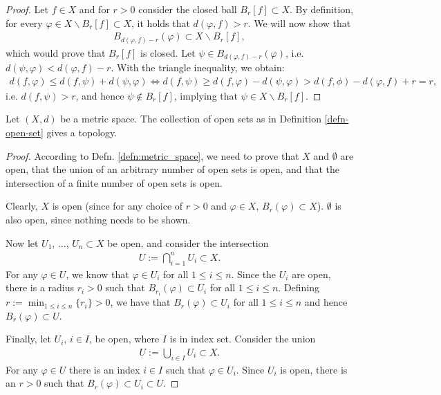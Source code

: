 \begin{proof}
	Let $f\in X$ and for $r > 0$ consider the closed ball $B_{r}[f]\subset X$. By definition, for every $\varphi \in X\backslash B_{r}[f]\subset X$, it holds that $d(\varphi, f) > r$. We will now show that 
	\begin{align}
		B_{d(\varphi, f) - r}(\varphi) \subset X \backslash B_{r}[f],
	\end{align}
	which would prove that $B_{r}[f]$ is closed. Let $\psi\in B_{d(\varphi, f) - r}(\varphi)$, i.e. $d(\psi, \varphi) < d(\varphi, f) -r$. With the triangle inequality, we obtain:
	\begin{align}
		d(f, \varphi) \leq d(f, \psi) + d(\psi, \varphi) \Leftrightarrow d(f, \psi) \geq d(f, \varphi) - d(\psi, \varphi) > d(f, \phi) - d(\varphi, f) + r = r, 
	\end{align}
	i.e. $d(f, \psi) > r$, and hence $\psi\notin B_r[f]$, implying that $\psi\in X\backslash B_{r}[f]$. 
\end{proof}

\begin{theorem}\label{thrm:open_sets_form_topology}
	Let $(X, d)$ be a metric space. The collection of open sets as in Definition \ref{defn-open-set} gives a topology.
\end{theorem}
\begin{proof}		
	According to Defn. \ref{defn:metric_space}, we need to prove that $X$ and $\emptyset$ are open, that the union of an arbitrary number of open sets is open, and that the intersection of a finite number of open sets is open. 
	
	Clearly, $X$ is open (since for any choice of $r > 0$ and $\varphi\in X$, $B_{r}(\varphi)\subset X$). $\emptyset$ is also open, since nothing needs to be shown.
	
	Now let $U_{1}$, $\dots$, $U_{n}\subset X$ be open, and consider the intersection
	\begin{align}
		U := \bigcap_{i=1}^{n}U_{i} \subset X.
	\end{align} 
	For any $\varphi\in U$, we know that $\varphi\in U_i$ for all $1\leq i \leq n$. Since the $U_{i}$ are open, there is a radius $r_{i} > 0$ such that $B_{r_i}(\varphi) \subset U_i$ for all $1\leq i \leq n$. Defining $r := \min_{1 \leq i \leq n}\{r_{i}\} > 0$, we have that $B_{r}(\varphi) \subset U_i$ for all $1\leq i\leq n$ and hence $B_{r}(\varphi)\subset U$.
	
	Finally, let $U_{i}$, $i\in I$, be open, where $I$ is in index set. Consider the union
	\begin{align}
		U := \bigcup_{i\in I}U_{i} \subset X.
	\end{align}
	For any $\varphi\in U$ there is an index $i\in I$ such that $\varphi\in U_i$. Since $U_i$ is open, there is an $r > 0$ such that $B_{r}(\varphi) \subset U_i \subset U$.
\end{proof}

